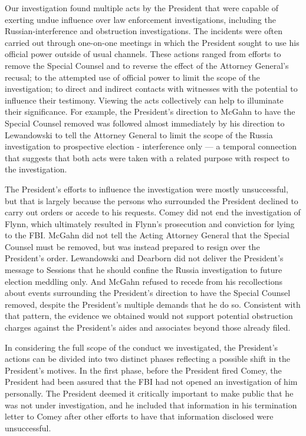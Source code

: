 Our investigation found multiple acts by the President that were capable of exerting undue influence over law enforcement investigations, including the Russian-interference and obstruction investigations.
The incidents were often carried out through one-on-one meetings in which the President sought to use his official power outside of usual channels.
These actions ranged from efforts to remove the Special Counsel and to reverse the effect of the Attorney General's recusal; to the attempted use of official power to limit the scope of the investigation; to direct and indirect contacts with witnesses with the potential to influence their testimony.
Viewing the acts collectively can help to illuminate their significance.
For example, the President's direction to McGahn to have the Special Counsel removed was followed almost immediately by his direction to Lewandowski to tell the Attorney General to limit the scope of the Russia investigation to prospective election - interference only — a temporal connection that suggests that both acts were taken with a related purpose with respect to the investigation.

The President's efforts to influence the investigation were mostly unsuccessful, but that is largely because the persons who surrounded the President declined to carry out orders or accede to his requests.
Comey did not end the investigation of Flynn, which ultimately resulted in Flynn's prosecution and conviction for lying to the FBI.
McGahn did not tell the Acting Attorney General that the Special Counsel must be removed, but was instead prepared to resign over the President's order.
Lewandowski and Dearborn did not deliver the President's message to Sessions that he should confine the Russia investigation to future election meddling only.
And McGahn refused to recede from his recollections about events surrounding the President's direction to have the Special Counsel removed, despite the President's multiple demands that he do so.
Consistent with that pattern, the evidence we obtained would not support potential obstruction charges against the President's aides and associates beyond those already filed.

In considering the full scope of the conduct we investigated, the President's actions can be divided into two distinct phases reflecting a possible shift in the President's motives.
In the first phase, before the President fired Comey, the President had been assured that the FBI had not opened an investigation of him personally.
The President deemed it critically important to make public that he was not under investigation, and he included that information in his termination letter to Comey after other efforts to have that information disclosed were unsuccessful.

